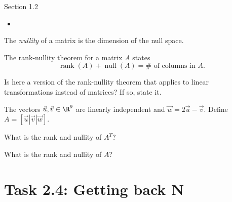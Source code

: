 \documentclass{problemset}
\DeclareMathOperator{\Rank}{rank}
\DeclareMathOperator{\Null}{null}
\begin{document}
\begin{lesson}
	\newpage

	Section 1.2

	\begin{itemize}
		\item 
	\end{itemize}


	\newpage
\end{lesson}
	\begin{theorem}
	The \emph{nullity} of a matrix is the dimension of the null space.

	The rank-nullity theorem for a matrix $A$ states
	\[
		\Rank(A)+\Null(A) = \#\text{ of columns in }A.
	\]
	\end{theorem}

	\question
	\begin{parts}
		\item Is here a version of the rank-nullity theorem that applies to linear
			transformations instead of matrices? If so, state it.
	\end{parts}

	\question
	The vectors $\vec u,\vec v\in\R^9$ are linearly independent and $\vec w=2\vec u-\vec v$.
	Define $A=[\vec u|\vec v|\vec w]$.
	\begin{parts}
		\item What is the rank and nullity of $A^T$?
		\item What is the rank and nullity of $A$?
	\end{parts}









\newpage
\pagestyle{iola}
\section*{Task 2.4: Getting back N}
\end{document}
